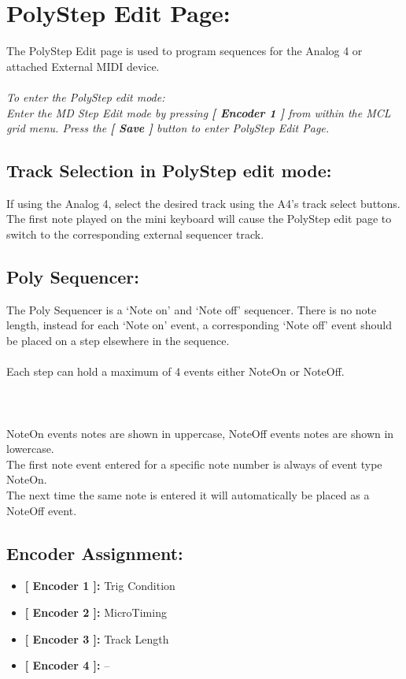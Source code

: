 \chapter{PolyStep Edit Page:}
The PolyStep Edit page is used to program sequences for the Analog 4 or attached External MIDI device.\\
\\
\textit{To enter the PolyStep edit mode:\\Enter the MD Step Edit mode by pressing \textbf{[ Encoder 1 ]} from within the MCL grid menu. Press the \textbf{[ Save ]} button to enter PolyStep Edit Page.}\\
\section{Track Selection in PolyStep edit mode:}
If using the Analog 4, select the desired track using the A4’s track select buttons. The first note played on the mini keyboard will cause the PolyStep edit page to switch to  the corresponding external sequencer track.
\section{Poly Sequencer: }
The Poly Sequencer is a ‘Note on’ and ‘Note off’ sequencer. There is no note length, instead for each ‘Note on’ event, a corresponding ‘Note off’ event should be placed on a step elsewhere in the sequence.\\
\\
Each step can hold a maximum of 4 events either NoteOn or NoteOff.\\\\
\\
\\
NoteOn events notes are shown in uppercase, NoteOff events notes are shown in lowercase.
\\
The first note event entered for a specific note number is always of event type NoteOn.\\
The next time the same note is entered it will automatically be placed as a NoteOff event.
\section{Encoder Assignment:}
\begin{itemize}
	\item \textbf{[ Encoder 1 ]: } Trig Condition
	\item \textbf{[ Encoder 2 ]: } MicroTiming
	\item \textbf{[ Encoder 3 ]: } Track Length
	\item \textbf{[ Encoder 4 ]: } --
\end{itemize}

